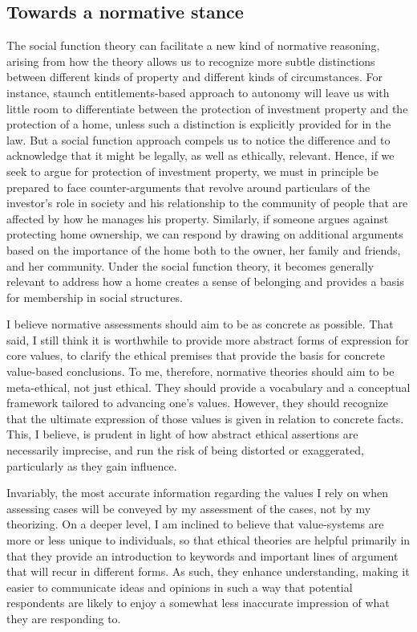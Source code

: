 \subsection{Towards a normative stance}

The social function theory can facilitate a new kind of normative reasoning, arising from how the theory allows us to recognize more subtle distinctions between different kinds of property and different kinds of circumstances. For instance, staunch entitlements-based approach to autonomy will leave us with little room to differentiate between the protection of investment property and the protection of a home, unless such a distinction is explicitly provided for in the law. But a social function approach compels us to notice the difference and to acknowledge that it might be legally, as well as ethically, relevant. Hence, if we seek to argue for protection of investment property, we must in principle be prepared to face counter-arguments that revolve around particulars of the investor's role in society and his relationship to the community of people that are affected by how he manages his property. Similarly, if someone argues against protecting home ownership, we can respond by drawing on additional arguments based on the importance of the home both to the owner, her family and friends, and her community. Under the social function theory, it becomes generally relevant to address how a home creates a sense of belonging and provides a basis for membership in social structures.

I believe normative assessments should aim to be as concrete as possible. That said, I still think it is worthwhile to provide more abstract forms of expression for core values, to clarify the ethical premises that provide the basis for concrete value-based conclusions. To me, therefore, normative theories should aim to be meta-ethical, not just ethical. They should provide a vocabulary and a conceptual framework tailored to advancing one's values. However, they should recognize that the ultimate expression of those values is given in relation to concrete facts. This, I believe, is prudent in light of how abstract ethical assertions are necessarily imprecise, and run the risk of being distorted or exaggerated, particularly as they gain influence.

Invariably, the most accurate information regarding the values I rely on when assessing cases will be conveyed by my assessment of the cases, not by my theorizing. On a deeper level, I am inclined to believe that value-systems are more or less unique to individuals, so that ethical theories are helpful primarily in that they provide an introduction to keywords and important lines of argument that will recur in different forms. As such, they enhance understanding, making it easier to communicate ideas and opinions in such a way that potential respondents are likely to enjoy a somewhat less inaccurate impression of what they are responding to. 

